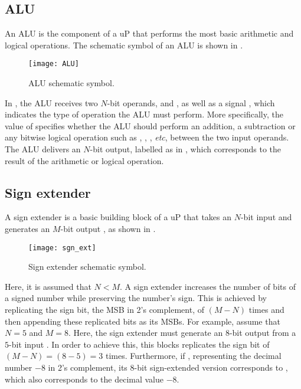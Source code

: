 \documentclass[number=03]{assignment}
\begin{document}
\acresetall
\subsection{\acs{ALU}}\label{sec:ALU_background}
An \ac{ALU} is the component of a \ac{uP} that performs the most basic arithmetic and logical operations.
The schematic symbol of an \ac{ALU} is shown in .
%
\begin{figure}[!ht]
\centering
\texttt{[image: ALU]}
\caption{\ac{ALU} schematic symbol.}
\label{Figure:ALU}
\end{figure}
%
\newpage 
In , the \ac{ALU} receives two $N$-bit operands,  and , as well as a signal , which indicates the type of operation the \ac{ALU} must perform. 
More specifically, the value of  specifies whether the \ac{ALU} should perform an addition, a subtraction or any bitwise logical operation such as , , , \emph{etc}, between the two input operands.
The \ac{ALU} delivers an $N$-bit output, labelled as  in , which corresponds to the result of the arithmetic or logical operation.

\subsection{Sign extender}\label{sec:SgnExt_background}
A sign extender is a basic building block of a \ac{uP} that takes an $N$-bit input  and generates an $M$-bit output , as shown in .
%
\begin{figure}[!h]
\centering
\texttt{[image: sgn\_ext]}
\caption{Sign extender schematic symbol.}
\label{Figure:sgn_ext}
\end{figure}
%

Here, it is assumed that $N < M$.
A sign extender increases the number of bits of a signed number while preserving the number's sign.
This is achieved by replicating the sign bit, the \ac{MSB} in 2's complement, of  $(M-N)$ times and then appending these replicated bits as its \acp{MSB}.
For example, assume that $N=5$ and $M=8$.
Here, the sign extender must generate an $8$-bit output  from a $5$-bit input . 
In order to achieve this, this blocks replicates the sign bit of  $(M-N)=(8-5)=3$ times.
Furthermore, if , representing the decimal number $-8$ in 2's complement, its $8$-bit sign-extended version corresponds to , which also corresponds to the decimal value $-8$.
\end{document}
